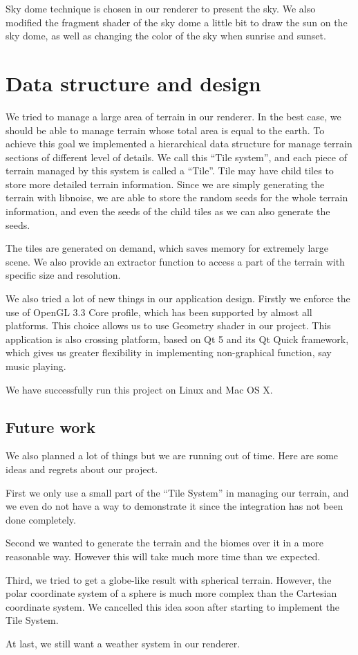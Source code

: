 \documentclass[10pt,twocolumn]{article}
\begin{document}
Sky dome technique is chosen in our renderer to present the sky. We also
modified the fragment shader of the sky dome a little bit to draw the sun on
the sky dome, as well as changing the color of the sky when sunrise and
sunset.

\section{Data structure and design}

We tried to manage a large area of terrain in our renderer. In the best case,
we should be able to manage terrain whose total area is equal to the earth.
To achieve this goal we implemented a hierarchical data structure for manage
terrain sections of different level of details. We call this ``Tile system'',
and each piece of terrain managed by this system is called a ``Tile''. Tile
may have child tiles to store more detailed terrain information. Since we are
simply generating the terrain with libnoise, we are able to store the random
seeds for the whole terrain information, and even the seeds of the child tiles
as we can also generate the seeds.

The tiles are generated on demand, which saves memory for extremely large
scene. We also provide an extractor function to access a part of the terrain
with specific size and resolution.

We also tried a lot of new things in our application design. Firstly we
enforce the use of OpenGL 3.3 Core profile, which has been supported by almost
all platforms. This choice allows us to use Geometry shader in our project.
This application is also crossing platform, based on Qt 5 and its Qt Quick
framework, which gives us greater flexibility in implementing non-graphical
function, say music playing.

We have successfully run this project on Linux and Mac OS X.

\subsection{Future work}

We also planned a lot of things but we are running out of time. Here are some
ideas and regrets about our project.

First we only use a small part of the ``Tile System'' in managing our terrain,
and we even do not have a way to demonstrate it since the integration has not
been done completely.

Second we wanted to generate the terrain and the biomes over it in a more
reasonable way. However this will take much more time than we expected.

Third, we tried to get a globe-like result with spherical terrain. However,
the polar coordinate system of a sphere is much more complex than the
Cartesian coordinate system. We cancelled this idea soon after starting to
implement the Tile System.

At last, we still want a weather system in our renderer.

{}

\end{document}
